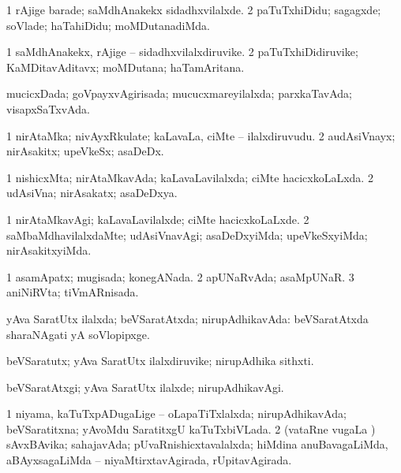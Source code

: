 \bentry
{} 
\gl{\kirxvi}
\expl{}
\bmng
\bnum
\num{1} rAjige barade; saMdhAnakekx sidadhxvilalxde. 
\num{2} paTuTxhiDidu; sagagxde; soVlade; haTa{hi}Didu; moMDutanadiMda. 
\enum
\emng
\eentry

\bentry
{} 
\gl{\nA}
\expl{}
\bmng
\bnum
\num{1} saMdhAnakekx, rAjige -- sidadhxvilalxdiruvike. 
\num{2} paTuTxhiDidiruvike; KaMDitavAditavx; moMDutana; haTamAritana. 
\enum
\emng
\eentry

\bentry
{} 
\gl{\gu}
\expl{}
\bmng
 mucicxDada; goVpayxvAgirisada; mucucxmareyilalxda; parxkaTavAda; visapxSaTxvAda. 
\emng
\eentry

\bentry
{} 
\gl{\nA}
\expl{}
\bmng
\bnum
\num{1} nirAtaMka; nivAyxRkulate; kaLavaLa, ciMte -- ilalxdiruvudu. 
\num{2} audAsiVnayx; nirAsakitx; upeVkeSx; asaDeDx. 
\enum
\emng
\eentry

\bentry
{} 
\gl{\gu}
\expl{}
\bmng
\bnum
\num{1} nishicxMta; nirAtaMkavAda; kaLavaLavilalxda; ciMte hacicxkoLaLxda. 
\num{2} udAsiVna; nirAsakatx; asaDeDxya. 
\enum
\emng
\eentry

\bentry
{} 
\gl{\kirxvi}
\expl{}
\bmng
\bnum
\num{1} nirAtaMkavAgi; kaLavaLavilalxde; ciMte hacicxkoLaLxde. 
\num{2} saMbaMdhavilalxdaMte; udAsiVnavAgi; asaDeDxyiMda; upeVkeSxyiMda; nirAsakitxyiMda. 
\enum
\emng
\eentry

\bentry
{} 
\gl{\gu}
\expl{}
\bmng
\bnum
\num{1} asamApatx; mugisada; konegANada. 
\num{2} apUNaRvAda; asaMpUNaR.
\num{3} aniNiRVta; tiVmARnisada. 
\enum
\emng
\eentry

\bentry
{} 
\gl{\gu}
\expl{}
\bmng
 yAva SaratUtx ilalxda; beVSaratAtxda; nirupAdhikavAda:  beVSaratAtxda sharaNAgati yA soVlopipxge. 
\emng
\eentry

\bentry
{} 
\gl{\nA}
\expl{}
\bmng
 beVSaratutx; yAva SaratUtx ilalxdiruvike; nirupAdhika sithxti. 
\emng
\eentry

\bentry
{} 
\gl{\kirxvi}
\expl{}
\bmng
 beVSaratAtxgi; yAva SaratUtx ilalxde; nirupAdhikavAgi. 
\emng
\eentry

\bentry
{} 
\gl{\gu}
\expl{}
\bmng
\bnum
\num{1} niyama, kaTuTxpADugaLige -- oLapaTiTxlalxda; nirupAdhikavAda; beVSaratitxna; yAvoMdu SaratitxgU kaTuTxbiVLada. 
\num{2} (vataRne \mo vugaLa \vi) sAvxBAvika; sahajavAda; pUvaRnishicxtavalalxda; hiMdina anuBavagaLiMda, aBAyxsagaLiMda -- niyaMtirxtavAgirada, rUpitavAgirada. 
\enum
\emng

